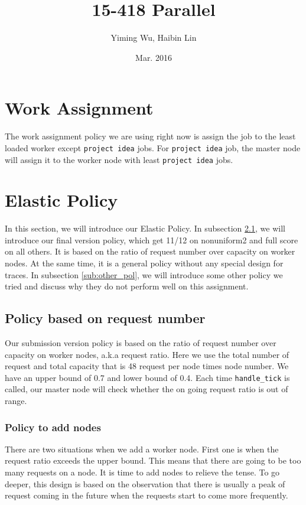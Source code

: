 \documentclass[11pt]{article}
\title{15-418 Parallel}
\author{Yiming Wu, Haibin Lin}
\date{Mar. 2016}
\newcommand{\code}[1]{\texttt{#1}}
\begin{document}
\maketitle

\section{Work Assignment} %
\label{sec:work_assignment}
The work assignment policy we are using right now is assign the job to the least loaded worker except \code{project idea} jobs.
For \code{project idea} job, the master node will assign it to the worker node with least \code{project idea} jobs.

\section{Elastic Policy} %
In this section, we will introduce our Elastic Policy.
In subsection \ref{sub:policy_based_on_request_number}, we will introduce our final version policy, which get 11/12 on nonuniform2 and full score on all others.
It is based on the ratio of request number over capacity on worker nodes.
At the same time, it is a general policy without any special design for traces.
In subsection \ref{sub:other_pol}, we will introduce some other policy we tried and discuss why they do not perform well on this assignment.

\subsection{Policy based on request number} %
\label{sub:policy_based_on_request_number}
Our submission version policy is based on the ratio of request number over capacity on worker nodes, a.k.a request ratio.
Here we use the total number of request and total capacity that is 48 request per node times node number.
We have an upper bound of 0.7 and lower bound of 0.4.
Each time \code{handle\_tick} is called, our master node will check whether the on going request ratio is out of range.

\subsubsection{Policy to add nodes} %
\label{ssub:policy_to_add_nodes}
There are two situations when we add a worker node. First one is when the request ratio exceeds the upper bound.
This means that there are going to be too many requests on a node.
It is time to add nodes to relieve the tense.
To go deeper, this design is based on the observation that there is usually a peak of request coming in the future when the requests start to come more frequently.
\end{document}
